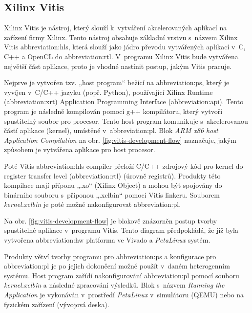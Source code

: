 \documentclass[a4paper, twoside, 11pt]{article}
\begin{document}
		\subsection{Xilinx Vitis}\label{subsec:xilinx-vitis}
		Xilinx Vitis je nástroj, který slouží k~vytváření akcelerovaných aplikací na zařízení firmy Xilinx. Tento nástroj obsahuje základní vrstvu s~názvem Xilinx Vitis \gls{abbreviation:hls}, která slouží jako jádro převodu vytvářených aplikací v~C, C++ a OpenCL do \gls{abbreviation:rtl}. V~programu Xilinx Vitis bude vytvářena největší část aplikace, proto je vhodné nastínit postup, jakým Vitis pracuje.
		\par
		Nejprve je vytvořen tzv. „host program“ bežící na \gls{abbreviation:ps}, který je vyvíjen v~C/C++ jazyku (popř. Python), používající Xilinx Runtime (\gls{abbreviation:xrt}) Application Programming Interface (\gls{abbreviation:api}). Tento program je následně kompilován pomocí g++ kompilátoru, který vytvoří spustitelný soubor pro procesor. Tento host program komunikuje s~akcelerovanou částí aplikace (kernel), umístěné v~\gls{abbreviation:pl}. Blok \textit{ARM x86 host Application Compilation} na obr. \ref{fig:vitis-development-flow} naznačuje, jakým způsobem je vytvářena aplikace pro host procesor. \cite{vitis-unified-software-platform-documentation-2022}\par
		Poté Vitis \gls{abbreviation:hls} compiler přeloží C/C++ zdrojový kód pro kernel do register transfer level (\gls{abbreviation:rtl}) (úrovně registrů). Produkty této kompilace mají příponu „.xo“ (Xilinx Object) a mohou být spojovány do binárního souboru s~příponou „.xclbin“ pomocí Vitis linkeru. Souborem \textit{kernel.xclbin} je poté možné nakonfigurovat \gls{abbreviation:pl}. \cite{vitis-unified-software-platform-documentation-2022}\par
		Na obr. \ref{fig:vitis-development-flow} je blokově znázorněn postup tvorby spustitelné aplikace v~programu Vitis. Tento diagram předpokládá, že již byla vytvořena \gls{abbreviation:hw} platforma ve Vivado a \textit{PetaLinux} systém.\par
		Produkty větví tvorby programu pro \gls{abbreviation:ps} a konfigurace pro \gls{abbreviation:pl} je po jejich dokončení možné použít v~daném heterogenním systému. Host program zařídí nakonfigurování \gls{abbreviation:pl} pomocí souboru \textit{kernel.xclbin} a následné zpracování výsledků. Blok s~názvem \textit{Running the Application} je vykonáván v~prostředí \textit{PetaLinux} v~simulátoru (QEMU) nebo na fyzickém zařízení (vývojová deska).
\end{document}
